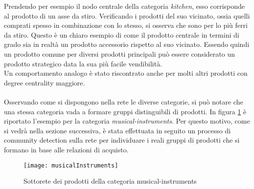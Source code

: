 Prendendo per esempio il nodo centrale della categoria \textit{kitchen}, esso corrisponde al prodotto di un asse da stiro. Verificando i prodotti del suo vicinato, ossia quelli comprati spesso in combinazione con lo stesso, si osserva che sono per lo più ferri da stiro. Questo è un chiaro esempio di come il prodotto centrale in termini di grado sia in realtà un prodotto accessorio rispetto al suo vicinato. Essendo quindi un prodotto comune per diversi prodotti principali può essere considerato un prodotto strategico data la sua più facile vendibilità. \\
Un comportamento analogo è stato riscontrato anche per molti altri prodotti con degree centrality maggiore.
\\\\
Osservando come si dispongono nella rete le diverse categorie, si può notare che una stessa categoria vada a formare gruppi distinguibili di prodotti. In figura \ref{fig:musicalInstruments} è riportato l'esempio per la categoria \textit{musical-instruments}. Per questo motivo, come si vedrà nella sezione successiva, è stata effettuata in seguito un processo di community detection sulla rete per individuare i reali gruppi di prodotti che si formano in base alle relazioni di acquisto.

\begin{figure}[]
    \texttt{[image: musicalInstruments]}\centering
    \caption{Sottorete dei prodotti della categoria musical-instruments}\label{fig:musicalInstruments}
\end{figure}

